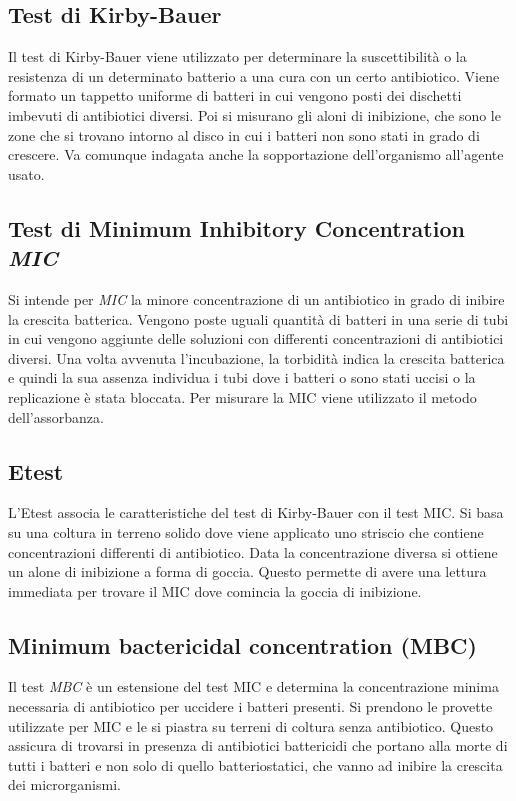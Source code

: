 	\subsection{Test di Kirby-Bauer}
	Il test di Kirby-Bauer viene utilizzato per determinare la suscettibilità o la resistenza di un determinato batterio a una cura con un certo antibiotico. 
	Viene formato un tappetto uniforme di batteri in cui vengono posti dei dischetti imbevuti di antibiotici diversi. 
	Poi si misurano gli aloni di inibizione, che sono le zone che si trovano intorno al disco in cui i batteri non sono stati in grado di crescere. 
	Va comunque indagata anche la sopportazione dell'organismo all'agente usato.

	\subsection{Test di Minimum Inhibitory Concentration \emph{MIC}}
	Si intende per \emph{MIC} la minore concentrazione di un antibiotico in grado di inibire la crescita batterica. 
	Vengono poste uguali quantità di batteri in una serie di tubi in cui vengono aggiunte delle soluzioni con differenti concentrazioni di antibiotici diversi. 
	Una volta avvenuta l'incubazione, la torbidità indica la crescita batterica e quindi la sua assenza individua i tubi dove i batteri o sono stati uccisi o la replicazione è stata bloccata. 
	Per misurare la MIC viene utilizzato il metodo dell'assorbanza. 

	\subsection{Etest}
	L'Etest associa le caratteristiche del test di Kirby-Bauer con il test MIC. 
	Si basa su una coltura in terreno solido dove viene applicato uno striscio che contiene concentrazioni differenti di antibiotico. 
	Data la concentrazione diversa si ottiene un alone di inibizione a forma di goccia. 
	Questo permette di avere una lettura immediata per trovare il MIC dove comincia la goccia di inibizione.

	\subsection{Minimum bactericidal concentration (MBC)}
	Il test \emph{MBC} \`e un estensione del test MIC e determina la concentrazione minima necessaria di antibiotico per uccidere i batteri presenti. 
	Si prendono le provette utilizzate per MIC e le si piastra su terreni di coltura senza antibiotico. 
	Questo assicura di trovarsi in presenza di antibiotici battericidi che portano alla morte di tutti i batteri e non solo di quello batteriostatici, che vanno ad inibire la crescita dei microrganismi. 

